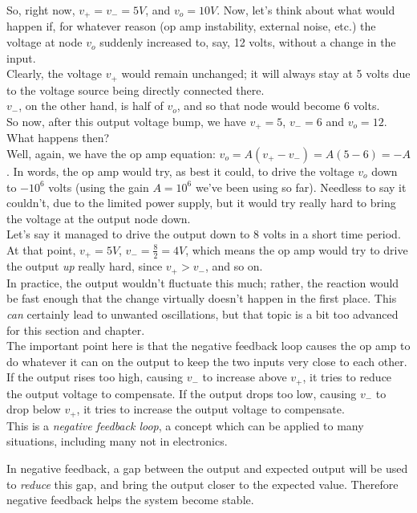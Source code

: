 \documentclass[12pt,a4paper]{report}
\begin{document}
So, right now, $v_+ = v_- = 5 V$, and $v_o = 10 V$. Now, let's think about what would happen if, for whatever reason (op amp instability, external noise, etc.) the voltage at node $v_o$ suddenly increased to, say, 12 volts, without a change in the input.\\
Clearly, the voltage $v_+$ would remain unchanged; it will always stay at 5 volts due to the voltage source being directly connected there.\\
$v_-$, on the other hand, is half of $v_o$, and so that node would become $6$ volts.\\
So now, after this output voltage bump, we have $v_+ = 5$, $v_- = 6$ and $v_o = 12$. What happens then?\\

Well, again, we have the op amp equation: $v_o = A(v_+ - v_-) = A(5 - 6) = -A$. In words, the op amp would try, as best it could, to drive the voltage $v_o$ down to $-10^6$ volts (using the gain $A=10^6$ we've been using so far). Needless to say it couldn't, due to the limited power supply, but it would try really hard to bring the voltage at the output node down.\\
Let's say it managed to drive the output down to 8 volts in a short time period. At that point, $v_+ = 5V$, $\displaystyle v_- = \frac{8}{2} = 4V$, which means the op amp would try to drive the output \emph{up} really hard, since $v_+ > v_-$, and so on.\\
In practice, the output wouldn't fluctuate this much; rather, the reaction would be fast enough that the change virtually doesn't happen in the first place. This \emph{can} certainly lead to unwanted oscillations, but that topic is a bit too advanced for this section and chapter.\\

The important point here is that the negative feedback loop causes the op amp to do whatever it can on the output to keep the two inputs very close to each other. If the output rises too high, causing $v_-$ to increase above $v_+$, it tries to reduce the output voltage to compensate. If the output drops too low, causing $v_-$ to drop below $v_+$, it tries to increase the output voltage to compensate.\\
This is a \emph{negative feedback loop}, a concept which can be applied to many situations, including many not in electronics.

In negative feedback, a gap between the output and expected output will be used to \emph{reduce} this gap, and bring the output closer to the expected value. Therefore negative feedback helps the system become stable.\\
\end{document}
